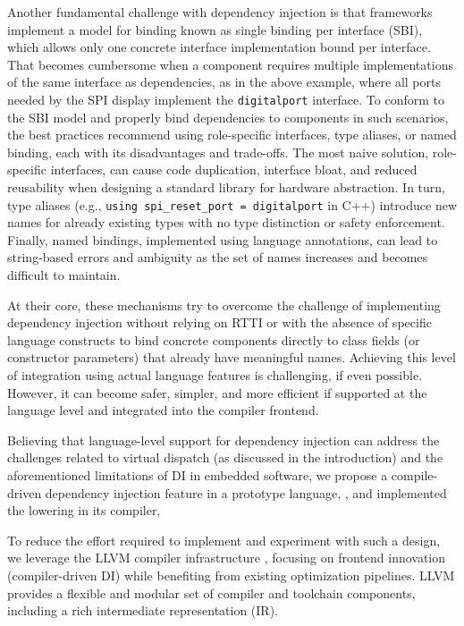 \documentclass[10pt,sigplan,screen,anonymous]{acmart}
\newcommand{\blindreview}[1]{{\color{teal}{<omitted for blind review>}}}
\begin{document}
Another fundamental challenge with dependency injection is that frameworks implement a model for binding known as single binding per interface (SBI), which allows only one concrete interface implementation bound per interface. That becomes cumbersome when a component requires multiple implementations of the same interface as dependencies, as in the above example, where all ports needed by the SPI display implement the {\tt digitalport} interface. To conform to the SBI model and properly bind dependencies to components in such scenarios, the best practices recommend using role-specific interfaces, type aliases, or named binding, each with its disadvantages and trade-offs. The most naive solution, role-specific interfaces, can cause code duplication, interface bloat, and reduced reusability when designing a standard library for hardware abstraction. In turn, type aliases (e.g., {\tt using spi\_reset\_port = digitalport} in C++) introduce new names for already existing types with no type distinction or safety enforcement. Finally, named bindings, implemented using language annotations, can lead to string-based errors and ambiguity as the set of names increases and becomes difficult to maintain.

At their core, these mechanisms try to overcome the challenge of implementing dependency injection without relying on RTTI or with the absence of specific language constructs to bind concrete components directly to class fields (or constructor parameters) that already have meaningful names. Achieving this level of integration using actual language features is challenging, if even possible. However, it can become safer, simpler, and more efficient if supported at the language level and integrated into the compiler frontend.

Believing that language-level support for dependency injection can address the challenges related to virtual dispatch (as discussed in the introduction) and the aforementioned limitations of DI in embedded software, we propose a compile-driven dependency injection feature in a prototype language, \blindreview{Robotics Language \cite{robcmp}}, and implemented the lowering in its compiler, \blindreview{robcmp.\footnote{The Robotics Language is developed as part of research projects at Universidade Federal de Jataí and is used in the Compiler course of the Computer Science Bachelor's program.}}

To reduce the effort required to implement and experiment with such a design, we leverage the LLVM compiler infrastructure \cite{lattner2004llvm}, focusing on frontend innovation (compiler-driven DI) while benefiting from existing optimization pipelines. LLVM provides a flexible and modular set of compiler and toolchain components, including a rich intermediate representation (IR).
\end{document}
